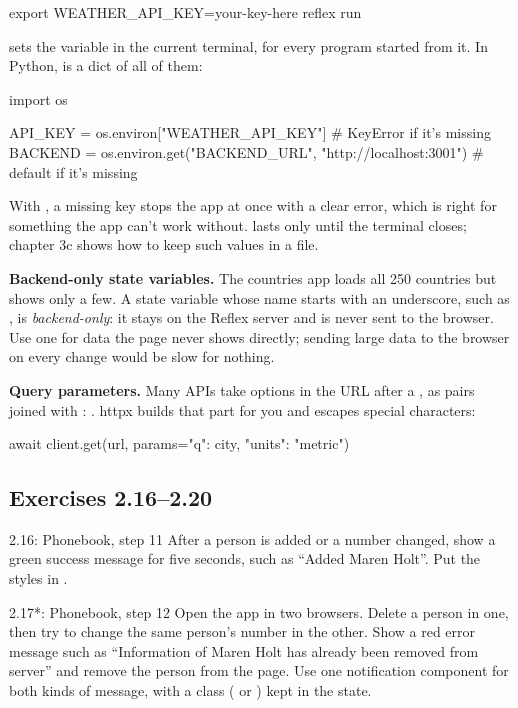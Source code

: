 \begin{code}
export WEATHER_API_KEY=your-key-here
reflex run
\end{code}

 sets the variable in the current terminal, for every program started from it. In Python,  is a dict of all of them:

\begin{py}
import os

API_KEY = os.environ["WEATHER_API_KEY"]                       # KeyError if it's missing
BACKEND = os.environ.get("BACKEND_URL", "http://localhost:3001")   # default if it's missing
\end{py}

With \cd{[...]}, a missing key stops the app at once with a clear error, which is right for something the app can't work without.  lasts only until the terminal closes; chapter 3c shows how to keep such values in a file.

\textbf{Backend-only state variables.} The countries app loads all 250 countries but shows only a few. A state variable whose name starts with an underscore, such as , is \emph{backend-only}: it stays on the Reflex server and is never sent to the browser. Use one for data the page never shows directly; sending large data to the browser on every change would be slow for nothing.

\textbf{Query parameters.} Many APIs take options in the URL after a , as  pairs joined with \cd{&}: . httpx builds that part for you and escapes special characters:

\begin{py}
await client.get(url, params={"q": city, "units": "metric"})
\end{py}

\subsection{Exercises 2.16--2.20}

\begin{exercise}{2.16: Phonebook, step 11}
After a person is added or a number changed, show a green success message for five seconds, such as ``Added Maren Holt''. Put the styles in .
\end{exercise}

\begin{exercise}{2.17*: Phonebook, step 12}
Open the app in two browsers. Delete a person in one, then try to change the same person's number in the other. Show a red error message such as ``Information of Maren Holt has already been removed from server'' and remove the person from the page. Use one notification component for both kinds of message, with a class ( or ) kept in the state.
\end{exercise}

